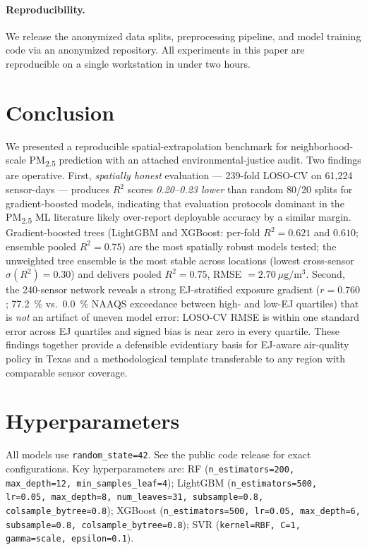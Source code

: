 \documentclass{article}
\begin{document}
\paragraph{Reproducibility.} We release the anonymized data splits, preprocessing pipeline, and model training code via an anonymized repository. All experiments in this paper are reproducible on a single workstation in under two hours.

\section{Conclusion}

We presented a reproducible spatial-extrapolation benchmark for neighborhood-scale PM\textsubscript{2.5} prediction with an attached environmental-justice audit. Two findings are operative. First, \emph{spatially honest} evaluation --- 239-fold LOSO-CV on 61{,}224 sensor-days --- produces $R^2$ scores \emph{0.20--0.23 lower} than random 80/20 splits for gradient-boosted models, indicating that evaluation protocols dominant in the PM\textsubscript{2.5} ML literature likely over-report deployable accuracy by a similar margin. Gradient-boosted trees (LightGBM and XGBoost: per-fold $R^2=0.621$ and $0.610$; ensemble pooled $R^2=0.75$) are the most spatially robust models tested; the unweighted tree ensemble is the most stable across locations (lowest cross-sensor $\sigma(R^2)=0.30$) and delivers pooled $R^2=0.75$, RMSE $=2.70~\mu\mathrm{g}/\mathrm{m}^3$. Second, the 240-sensor network reveals a strong EJ-stratified exposure gradient ($r=0.760$; \SI{77.2}{\percent} vs.\ \SI{0.0}{\percent} NAAQS exceedance between high- and low-EJ quartiles) that is \emph{not} an artifact of uneven model error: LOSO-CV RMSE is within one standard error across EJ quartiles and signed bias is near zero in every quartile. These findings together provide a defensible evidentiary basis for EJ-aware air-quality policy in Texas and a methodological template transferable to any region with comparable sensor coverage.




\appendix

\section{Hyperparameters}
\label{sec:hparams}
All models use \texttt{random\_state=42}. See the public code release for exact configurations. Key hyperparameters are: RF (\texttt{n\_estimators=200, max\_depth=12, min\_samples\_leaf=4}); LightGBM (\texttt{n\_estimators=500, lr=0.05, max\_depth=8, num\_leaves=31, subsample=0.8, colsample\_bytree=0.8}); XGBoost (\texttt{n\_estimators=500, lr=0.05, max\_depth=6, subsample=0.8, colsample\_bytree=0.8}); SVR (\texttt{kernel=RBF, C=1, gamma=scale, epsilon=0.1}).
\end{document}

